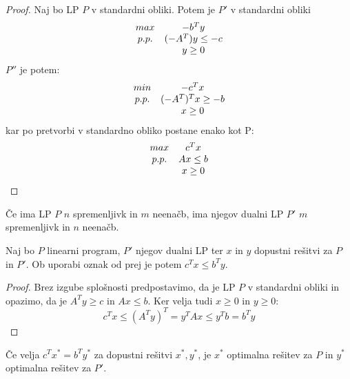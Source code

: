 \documentclass[11pt, a4paper]{article}
\begin{document}
    \begin{proof}
        Naj bo LP \(P\) v standardni obliki. Potem je  \(P'\) v standardni obliki
        \[
            \begin{array}{ c c }
                max & -b^Ty \\
                p.p. & (-A^T)y \le -c \\
                & y \ge 0 \\
            \end{array}
        \]
        \(P''\) je potem:
        \[
            \begin{array}{ c c }
                min & -c^Tx \\
                p.p. & (-A^T)^Tx \ge -b \\
                & x \ge 0 \\
            \end{array}
        \]
        kar po pretvorbi v standardno obliko postane enako kot P:
        \[
            \begin{array}{ c c }
                max & c^Tx \\
                p.p. & Ax \le b \\
                & x \ge 0 \\
            \end{array}
        \]
    \end{proof}

    \begin{remark}
        Če ima LP \(P\) \(n\) spremenljivk in \(m\) neenačb, ima njegov dualni LP \(P'\) \(m\) spremenljivk in \(n\) neenačb.
    \end{remark}

    \begin{theorem}
        Naj bo \(P\) linearni program, \(P'\) njegov dualni LP ter \(x\) in \(y\) dopustni rešitvi za \(P\) in \(P'\). Ob uporabi oznak od prej je potem \(c^Tx \le b^Ty\).
    \end{theorem}

    \begin{proof}
        Brez izgube splošnosti predpostavimo, da je LP \(P\) v standardni obliki in opazimo, da je \(A^Ty \ge c\) in \(Ax \le b\). Ker velja tudi \(x \ge 0\) in \(y \ge 0\):
        \[c^Tx \le (A^Ty)^T = y^TAx \le y^Tb = b^Ty\]
    \end{proof}

    \begin{corollary}
        \label{optimalnost}
        Če velja \(c^Tx^* = b^Ty^*\) za dopustni rešitvi \(x^*,y^*\), je \(x^*\) optimalna rešitev za \(P\) in \(y^*\) optimalna rešitev za \(P'\).
    \end{corollary}
\end{document}
